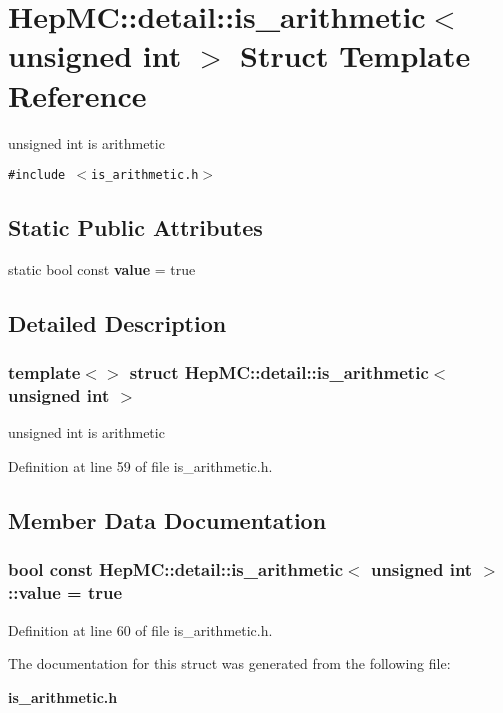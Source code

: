 \section{Hep\-MC::detail::is\_\-arithmetic$<$ unsigned int $>$ Struct Template Reference}
\label{structHepMC_1_1detail_1_1is__arithmetic_3_01unsigned_01int_01_4}
unsigned int is arithmetic  


{\tt \#include $<$is\_\-arithmetic.h$>$}

\subsection*{Static Public Attributes}
\begin{CompactItemize}
\item 
static bool const {\bf value} = true
\end{CompactItemize}


\subsection{Detailed Description}
\subsubsection*{template$<$$>$ struct Hep\-MC::detail::is\_\-arithmetic$<$ unsigned int $>$}

unsigned int is arithmetic 



Definition at line 59 of file is\_\-arithmetic.h.

\subsection{Member Data Documentation}
\subsubsection{\setlength{\rightskip}{0pt plus 5cm}bool const {\bf Hep\-MC::detail::is\_\-arithmetic}$<$ unsigned int $>$::{\bf value} = true\hspace{0.3cm}{\tt  [static]}}\label{structHepMC_1_1detail_1_1is__arithmetic_3_01unsigned_01int_01_4_613695c9983cc5e22db670398434928a}




Definition at line 60 of file is\_\-arithmetic.h.

The documentation for this struct was generated from the following file:\begin{CompactItemize}
\item 
{\bf is\_\-arithmetic.h}\end{CompactItemize}
